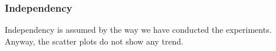 \subsubsection{Independency}\label{subsubsec:hdassumptionsindependency}

Independency is assumed by the way we have conducted the experiments. Anyway,
the scatter plots do not show any trend.
